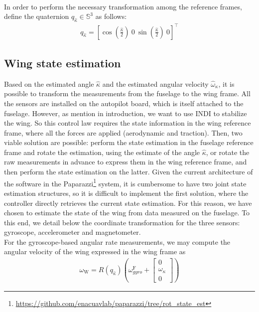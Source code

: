 \\
In order to perform the necessary transformation among the reference frames, define the quaternion $q_{\hat{\kappa}} \in {\mathbb S}^3$ as follows:
\begin{align}
\label{eq:rot_quat}
    q_{\hat{\kappa}} =  \left [\cos\left(\frac{\hat{\kappa}}{2}\right) ~ 0 ~ \sin\left(\frac{\hat{\kappa}}{2}\right) ~ 0 \right]^\top
\end{align}


\subsection{Wing state estimation}
Based on the estimated angle $\hat{\kappa}$ and the estimated angular velocity $\hat{\omega}_{\kappa}$, it is possible to transform the measurements from the fuselage to the wing frame. All the sensors are installed on the autopilot board, which is itself attached to the fuselage. However, as mention in introduction, we want to use INDI to stabilize the wing. So this control law requires the state information in the wing reference frame, where all the forces are applied (aerodynamic and traction).
Then, two viable solution are possible: perform the state estimation in the fuselage reference frame and rotate the estimation, using the estimate of the angle $\hat{\kappa}$, or rotate the raw measurements in advance to express them in the wing reference frame, and then perform the state estimation on the latter. 
Given the current architecture of the software in the Paparazzi\footnote{\url{https://github.com/enacuavlab/paparazzi/tree/rot_state_est}} system, it is cumbersome to have two joint state estimation structures, so it is difficult to implement the first solution, where the controller directly retrieves the current state estimation. For this reason, we have chosen to estimate the state of the wing from data measured on the fuselage. To this end, we detail below the coordinate transformation for the three sensors: gyroscope, accelerometer and magnetometer. \\
\indent For the gyroscope-based angular rate measurements, we may compute the angular velocity of the wing expressed in the wing frame as
\begin{align}
    \label{eq:gyro_deplacement}
    \omega_{\text{W}} = R(q_{\hat{\kappa}}) \left( \omega_{gyro}^{\text{F}} + \begin{bmatrix}
    0\\ \omega_{\kappa} \\ 0
    \end{bmatrix}  \right) 
\end{align}
